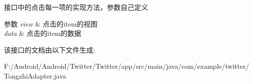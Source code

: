 接口中的点击每一项的实现方法，参数自己定义


\begin{DoxyParams}{参数}
{\em view} & 点击的item的视图 \\
\hline
{\em data} & 点击的item的数据 \\
\hline
\end{DoxyParams}


该接口的文档由以下文件生成\+:\begin{DoxyCompactItemize}
\item 
F\+:/\+Android/\+Android/\+Twitter/\+Twitter/app/src/main/java/com/example/twitter/Tongzhi\+Adapter.\+java\end{DoxyCompactItemize}
